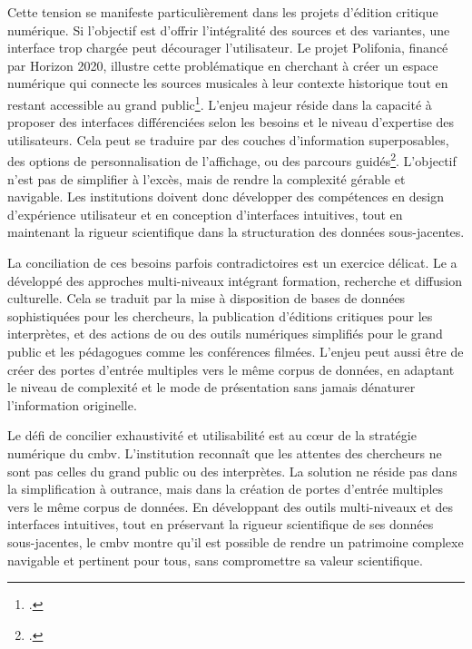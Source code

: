 Cette tension se manifeste particulièrement dans les projets d'édition critique numérique. Si l'objectif est d'offrir l'intégralité des sources et des variantes, une interface trop chargée peut décourager l'utilisateur. Le projet Polifonia, financé par Horizon 2020, illustre cette problématique en cherchant à créer un espace numérique qui connecte les sources musicales à leur contexte historique tout en restant accessible au grand public\footcite{PolifoniaProjetRecherche2022}. L'enjeu majeur réside dans la capacité à proposer des interfaces différenciées selon les besoins et le niveau d'expertise des utilisateurs. Cela peut se traduire par des couches d'information superposables, des options de personnalisation de l'affichage, ou des parcours guidés\footcite{PolifoniaProjetRecherche2022}. L'objectif n'est pas de simplifier à l'excès, mais de rendre la complexité gérable et navigable. Les institutions doivent donc développer des compétences en design d'expérience utilisateur et en conception d'interfaces intuitives, tout en maintenant la rigueur scientifique dans la structuration des données sous-jacentes.

La conciliation de ces besoins parfois contradictoires est un exercice délicat. Le  a développé des approches multi-niveaux intégrant formation, recherche et diffusion culturelle. Cela se traduit par la mise à disposition de bases de données sophistiquées pour les chercheurs, la publication d'éditions critiques pour les interprètes, et des actions de  ou des outils numériques simplifiés pour le grand public et les pédagogues comme les conférences filmées. L'enjeu peut aussi être de créer des portes d'entrée multiples vers le même corpus de données, en adaptant le niveau de complexité et le mode de présentation sans jamais dénaturer l'information originelle.

Le défi de concilier exhaustivité et utilisabilité est au cœur de la stratégie numérique du \gls{cmbv}. L'institution reconnaît que les attentes des chercheurs ne sont pas celles du grand public ou des interprètes. La solution ne réside pas dans la simplification à outrance, mais dans la création de portes d'entrée multiples vers le même corpus de données. En développant des outils multi-niveaux et des interfaces intuitives, tout en préservant la rigueur scientifique de ses données sous-jacentes, le \gls{cmbv} montre qu'il est possible de rendre un patrimoine complexe navigable et pertinent pour tous, sans compromettre sa valeur scientifique.

